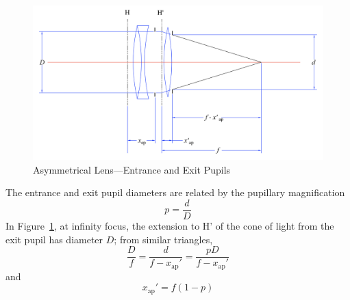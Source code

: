\documentclass[11pt, oneside]{scrartcl}   	%
\begin{document}
\begin{figure}[htbp] %
   \centering
   \includegraphics[width=\linewidth]{figure/fig_dofd_3} 
   \caption{Asymmetrical Lens—Entrance and Exit Pupils}
   \label{fig:asympup}
\end{figure}

The entrance and exit pupil diameters are related by the pupillary magnification
\begin{equation}
  p = \frac d D
  \label{eq:p}
\end{equation}
In Figure~\ref{fig:asympup}, at infinity focus, the extension to H' of
the cone of light from the exit pupil has diameter $D$; from similar
triangles,
\begin{equation}
  \label{eq:79}
  \frac D f = \frac d{f-x_\mathrm{ap}'}=\frac{pD}{f-x_\mathrm{ap}'}
\end{equation}
and
\begin{equation}
  \label{eq:80}
  x_\mathrm{ap}'=f(1-p)
\end{equation}
\end{document}
